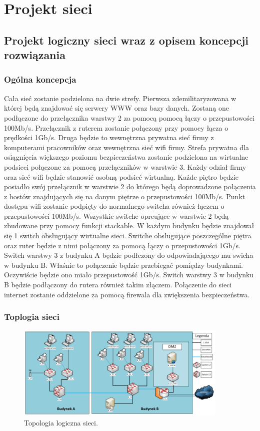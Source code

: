 \documentclass{report}
\begin{document}
\chapter{Projekt sieci}
\section{Projekt logiczny sieci wraz z opisem koncepcji rozwiązania}
\subsection{Ogólna koncepcja}

Cała sieć zostanie podzielona na dwie strefy. Pierwsza zdemilitaryzowana w której będą znajdować się serwery WWW oraz bazy danych. 
Zostaną one podłączone do przełącznika warstwy 2 za pomocą pomocą łączy o przepustowości 100Mb/s. Przełącznik z ruterem zostanie połączony 
przy pomocy łącza o prędkości 1Gb/s. Druga będzie to wewnętrzna prywatna sieć firmy z komputerami pracowników oraz wewnętrzna sieć wifi firmy. 
Strefa prywatna dla osiągnięcia większego poziomu bezpieczeństwa zostanie podzielona na wirtualne podsieci połączone za pomocą przełączników w warstwie 3. Każdy odział firmy
oraz sieć wifi będzie stanowić osobną podsieć wirtualną. Każde piętro będzie posiadło swój przełącznik w warstwie 2 do którego będą
doprowadzone połączenia z hostów znajdujących się na danym piętrze o przepustowości 100Mb/s.
Punkt dostępu wifi zostanie  podpięty do normalnego switcha również łączem o przepustowości 100Mb/s. Wszystkie switche opreujące
w warstwie 2 będą zbudowane przy pomocy funkcji stackable. W każdym budynku będzie znajdował 
się 1 switch obsługujący wirtualne sieci. Switche obsługujące poszczególne piętra oraz ruter będzie z nimi połączony za pomocą łączy o przepustowości 1Gb/s.
Switch warstwy 3 z budynku A będzie podłczony do odpowiadającego mu swicha w budynku B. Właśnie to połączenie będzie przebiegać pomiędzy budynkami. Oczywiście
będzie ono miało przepustowość 1Gb/s. Switch warstwy 3 w budynku B będzie podłączony do rutera również takim złączem. 
Połączenie do sieci internet zostanie oddzielone za pomocą firewala dla zwiększenia bezpieczeństwa.

\subsection{Toplogia sieci}
\begin{figure}[H]
  \centering
      \includegraphics[width=0.9\textwidth]{./obrazki/topo_log.png}
  \caption{Topologia logiczna sieci.}
\end{figure}
\end{document}
